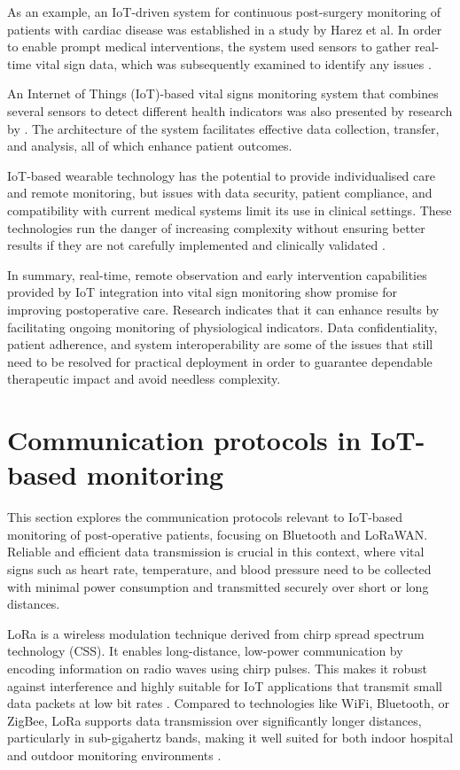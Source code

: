 As an example, an IoT-driven system for continuous post-surgery monitoring of patients with cardiac disease was established in a study by Harez et al. In order to enable prompt medical interventions, the system used sensors to gather real-time vital sign data, which was subsequently examined to identify any issues \cite{Harez_2024pxm}.

An Internet of Things (IoT)-based vital signs monitoring system that combines several sensors to detect different health indicators was also presented by research by \cite{Sundaravadivel_IoT_vital_signs}. The architecture of the system facilitates effective data collection, transfer, and analysis, all of which enhance patient outcomes.

IoT-based wearable technology has the potential to provide individualised care and remote monitoring, but issues with data security, patient compliance, and compatibility with current medical systems limit its use in clinical settings. These technologies run the danger of increasing complexity without ensuring better results if they are not carefully implemented and clinically validated \cite{Hamed_Wearable_Healthcare}.

In summary, real-time, remote observation and early intervention capabilities provided by IoT integration into vital sign monitoring show promise for improving postoperative care. Research indicates that it can enhance results by facilitating ongoing monitoring of physiological indicators. Data confidentiality, patient adherence, and system interoperability are some of the issues that still need to be resolved for practical deployment in order to guarantee dependable therapeutic impact and avoid needless complexity.

\section{Communication protocols in IoT-based monitoring} %
This section explores the communication protocols relevant to IoT-based monitoring of post-operative patients, focusing on Bluetooth and LoRaWAN. Reliable and efficient data transmission is crucial in this context, where vital signs such as heart rate, temperature, and blood pressure need to be collected with minimal power consumption and transmitted securely over short or long distances.

LoRa is a wireless modulation technique derived from chirp spread spectrum technology (CSS). It enables long-distance, low-power communication by encoding information on radio waves using chirp pulses. This makes it robust against interference and highly suitable for IoT applications that transmit small data packets at low bit rates \cite{what_are_lora_lorawan}. Compared to technologies like WiFi, Bluetooth, or ZigBee, LoRa supports data transmission over significantly longer distances, particularly in sub-gigahertz bands, making it well suited for both indoor hospital and outdoor monitoring environments \cite{lora_documentation}.

